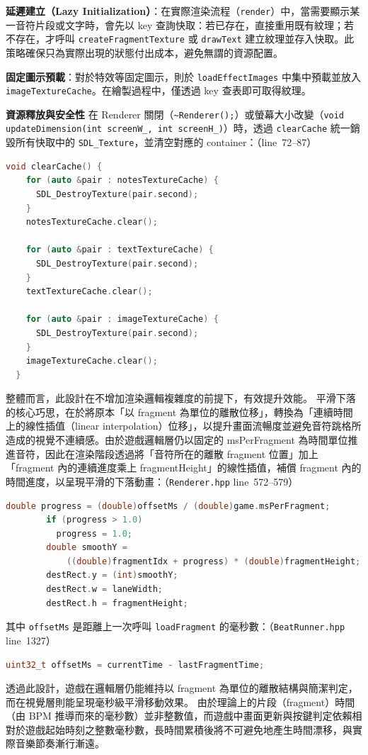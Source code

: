 \documentclass[a4paper,12pt]{article}
\begin{document}
\textbf{延遲建立（Lazy Initialization）}：在實際渲染流程（\verb|render|）中，當需要顯示某一音符片段或文字時，會先以 key 查詢快取：若已存在，直接重用既有紋理；若不存在，才呼叫 \verb|createFragmentTexture| 或 \verb|drawText| 建立紋理並存入快取。此策略確保只為實際出現的狀態付出成本，避免無謂的資源配置。

\textbf{固定圖示預載}：對於特效等固定圖示，則於 \verb|loadEffectImages| 中集中預載並放入 \verb|imageTextureCache|。在繪製過程中，僅透過 key 查表即可取得紋理。

\textbf{資源釋放與安全性} 在 Renderer 關閉（\verb|~Renderer();|）或螢幕大小改變（\verb|void updateDimension(int screenW_, int screenH_)|）時，透過 \verb|clearCache| 統一銷毀所有快取中的 \verb|SDL_Texture|，並清空對應的 container：（line~72--87）
\begin{lstlisting}[language=C++]
  void clearCache() {
    for (auto &pair : notesTextureCache) {
      SDL_DestroyTexture(pair.second);
    }
    notesTextureCache.clear();

    for (auto &pair : textTextureCache) {
      SDL_DestroyTexture(pair.second);
    }
    textTextureCache.clear();

    for (auto &pair : imageTextureCache) {
      SDL_DestroyTexture(pair.second);
    }
    imageTextureCache.clear();
  }
\end{lstlisting}

整體而言，此設計在不增加渲染邏輯複雜度的前提下，有效提升效能。
平滑下落的核心巧思，在於將原本「以 fragment 為單位的離散位移」，轉換為「連續時間上的線性插值（linear interpolation）位移」，以提升畫面流暢度並避免音符跳格所造成的視覺不連續感。由於遊戲邏輯層仍以固定的 msPerFragment 為時間單位推進音符，因此在渲染階段透過將「音符所在的離散 fragment 位置」加上「fragment 內的連續進度乘上 fragmentHeight」的線性插值，補償 fragment 內的時間進度，以呈現平滑的下落動畫：（\verb|Renderer.hpp| line~572--579）
\begin{lstlisting}[language=C++]
        double progress = (double)offsetMs / (double)game.msPerFragment;
        if (progress > 1.0)
          progress = 1.0;
        double smoothY =
            ((double)fragmentIdx + progress) * (double)fragmentHeight;
        destRect.y = (int)smoothY;
        destRect.w = laneWidth;
        destRect.h = fragmentHeight;
\end{lstlisting}
其中 \verb|offsetMs| 是距離上一次呼叫 \verb|loadFragment| 的毫秒數：（\verb|BeatRunner.hpp| line~1327）
\begin{lstlisting}[language=C++]
      uint32_t offsetMs = currentTime - lastFragmentTime;
\end{lstlisting}
透過此設計，遊戲在邏輯層仍能維持以 fragment 為單位的離散結構與簡潔判定，而在視覺層則能呈現毫秒級平滑移動效果。
\label{adjust}
由於理論上的片段（fragment）時間（由 BPM 推導而來的毫秒數）並非整數值，而遊戲中畫面更新與按鍵判定依賴相對於遊戲起始時刻之整數毫秒數，長時間累積後將不可避免地產生時間漂移，與實際音樂節奏漸行漸遠。
\end{document}
